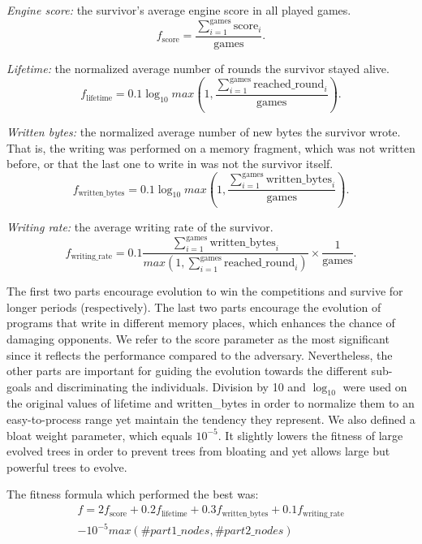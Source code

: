 \documentclass[dvipsnames, format=sigconf]{acmart}
\begin{document}
\textit{Engine score:} the survivor's average engine score in all played games. 
$$f_{\text{score}} = \frac{\sum_{i=1}^{\text{games}} \text{score}_i}{\text{games}}.$$

\textit{Lifetime:} the normalized average number of rounds the survivor stayed alive.
$$f_{\text{lifetime}} = 0.1 \log_{10} max\left(1, \frac{\sum_{i=1}^{\text{games}} \text{reached\_round}_i}{\text{games}}\right).$$

\textit{Written bytes:} the normalized average number of new bytes the survivor wrote. That is, the writing was performed on a memory fragment, which was not written before, or that the last one to write in was not the survivor itself.
$$f_{\text{written\_bytes}} = 0.1 \log_{10} max\left(1, \frac{\sum_{i=1}^{\text{games}} \text{written\_bytes}_i}{\text{games}}\right).$$

\textit{Writing rate:} the average writing rate of the survivor.
$$f_{\text{writing\_rate}} = 0.1 \frac{\sum_{i=1}^{\text{games}} \text{written\_bytes}_i}{max\left(1, \sum_{i=1}^{\text{games}} \text{reached\_round}_i\right)} \times \frac{1}{\text{games}}.$$

The first two parts encourage evolution to win the competitions and survive for longer periods (respectively). The last two parts encourage the evolution of programs that write in different memory places, which enhances the chance of damaging opponents. We refer to the score parameter as the most significant since it reflects the performance compared to the adversary. Nevertheless, the other parts are important for guiding the evolution towards the different sub-goals and discriminating the individuals. Division by 10 and $\log_{10}$ were used on the original values of lifetime and written\_bytes in order to normalize them to an easy-to-process range yet maintain the tendency they represent. We also defined a bloat weight parameter, which equals $10^{-5}$. It slightly lowers the fitness of large evolved trees in order to prevent trees from bloating and yet allows large but powerful trees to evolve.

The fitness formula which performed the best was: 
\begin{equation*}
\begin{split}
  f = 2 f_{\text{score}} + 0.2 f_{\text{lifetime}} + 0.3 f_{\text{written\_bytes}} + 0.1 f_{\text{writing\_rate}} \\ - 10^{-5} max(\#part1\_nodes, \#part2\_nodes)  
\end{split}
\end{equation*}
\end{document}
